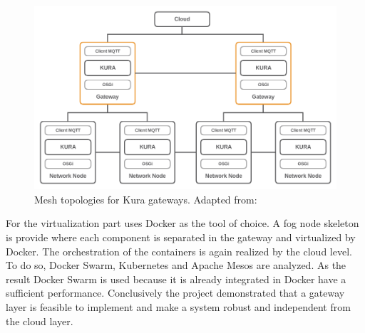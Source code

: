 \begin{figure}[H]
    \centering
    \includegraphics[width=\textwidth]{resources/images/kura_topologies.png}
    \caption[Mesh topologies for Kura gateways]{Mesh topologies for Kura gateways. Adapted from: \autocite[p. 4]{Bellavista:2017}}
    \label{fig:kura_gateway_topologies}
\end{figure}

For the virtualization part \autocite{Bellavista:2017} uses Docker as the tool of choice.
A fog node skeleton is provide where each component is separated in the gateway and virtualized by Docker.\autocite[cf.][p. 6]{Bellavista:2017}
The orchestration of the containers is again realized by the cloud level.
To do so, Docker Swarm, Kubernetes and Apache Mesos are analyzed.\autocite[cf.][p. 6 f.]{Bellavista:2017}
As the result Docker Swarm is used because it is already integrated in Docker have a sufficient performance.\autocite[cf.][p. 7]{Bellavista:2017}
Conclusively the project demonstrated that a gateway layer is feasible to implement and make a system robust and independent from the cloud layer.

